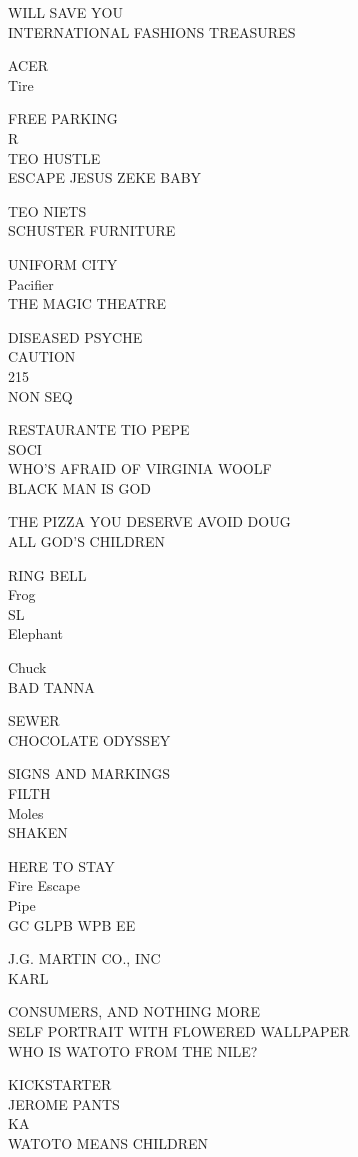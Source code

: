 \documentclass[10pt,letterpaper]{article}
\begin{document}
WILL SAVE YOU\\
INTERNATIONAL FASHIONS TREASURES

ACER\\
Tire

FREE PARKING\\
R\\
TEO HUSTLE\\
ESCAPE JESUS ZEKE BABY

TEO NIETS\\
SCHUSTER FURNITURE

UNIFORM CITY\\
Pacifier\\
THE MAGIC THEATRE

DISEASED PSYCHE\\
CAUTION\\
215\\
NON SEQ

RESTAURANTE TIO PEPE\\
SOCI\\
WHO'S AFRAID OF VIRGINIA WOOLF\\
BLACK MAN IS GOD

THE PIZZA YOU DESERVE AVOID DOUG\\
ALL GOD'S CHILDREN

RING BELL\\
Frog\\
SL\\
Elephant

Chuck\\
BAD TANNA

SEWER\\
CHOCOLATE ODYSSEY

SIGNS AND MARKINGS\\
FILTH\\
Moles\\
SHAKEN

HERE TO STAY\\
Fire Escape\\
Pipe\\
GC GLPB WPB EE

J.G. MARTIN CO., INC\\
KARL

CONSUMERS, AND NOTHING MORE\\
SELF PORTRAIT WITH FLOWERED WALLPAPER\\
WHO IS WATOTO FROM THE NILE?

KICKSTARTER\\
JEROME PANTS\\
KA\\
WATOTO MEANS CHILDREN
\end{document}
